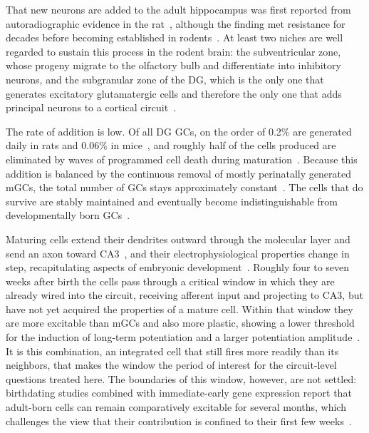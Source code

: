That new neurons are added to the adult hippocampus was first reported from autoradiographic evidence in the
rat~\parencite{altmanAutoradiographic1965}, although the finding met resistance for decades before becoming established in
rodents~\parencite{mingAdult2011, abbottAdult2020}. At least two niches are well regarded to sustain this process in the rodent
brain: the subventricular zone, whose progeny migrate to the olfactory bulb and differentiate into inhibitory neurons, and the
subgranular zone of the DG, which is the only one that generates excitatory glutamatergic cells and therefore the only one that
adds principal neurons to a cortical circuit~\parencite{folszAdultborn2023, faresNeurogenesis2019}.

The rate of addition is low. Of all DG GCs, on the order of 0.2\% are generated daily in rats and 0.06\% in
mice~\parencite{cameronAdult2001, folszAdultborn2023}, and roughly half of the cells produced are eliminated by waves of
programmed cell death during maturation~\parencite{folszAdultborn2023}. Because this addition is balanced by the continuous
removal of mostly perinatally generated mGCs, the total number of GCs stays approximately constant~\parencite{folszAdultborn2023}.
The cells that do survive are stably maintained and eventually become indistinguishable from developmentally born
GCs~\parencite{denoth-lippunerFormation2021, folszAdultborn2023}.

Maturing cells extend their dendrites outward through the molecular layer and send an axon toward
CA3~\parencite{zhaoDistinct2006}, and their electrophysiological properties change in step, recapitulating aspects of embryonic
development~\parencite{espositoNeuronal2005}. Roughly four to seven weeks after birth the cells pass through a critical window in
which they are already wired into the circuit, receiving afferent input and projecting to CA3, but have not yet acquired the
properties of a mature cell. Within that window they are more excitable than mGCs and also more plastic, showing a lower threshold
for the induction of long-term potentiation and a larger potentiation amplitude~\parencite{aimoneRegulation2014,
folszAdultborn2023}. It is this combination, an integrated cell that still fires more readily than its neighbors, that makes the
window the period of interest for the circuit-level questions treated here. The boundaries of this window, however, are not
settled: birthdating studies combined with immediate-early gene expression report that adult-born cells can remain comparatively
excitable for several months, which challenges the view that their contribution is confined to their first few
weeks~\parencite{folszAdultborn2023}.


